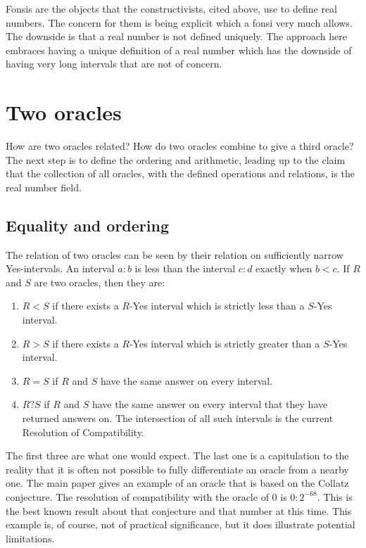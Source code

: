 \documentclass[12pt]{article}
\theoremstyle{remark}
\begin{document}
Fonsis are the objects that the constructivists, cited above, use to define real numbers. The concern for them is being explicit which a fonsi very much allows. The downside is that a real number is not defined uniquely. The approach here embraces having a unique definition of a real number which has the downside of having very long intervals that are not of concern. 

\section{Two oracles}

How are two oracles related? How do two oracles combine to give a third oracle?  The next step is to define the ordering and arithmetic, leading up to the claim that the collection of all oracles, with the defined operations and relations, is the real number field. 

\subsection{Equality and ordering}

The relation of two oracles can be seen by their relation on sufficiently narrow Yes-intervals. An interval $a:b$ is less than the interval $c:d$ exactly when $b < c$. If $R$ and $S$ are two oracles, then they are:
\begin{enumerate}
\item $R<S$ if there exists a $R$-Yes interval which is strictly less than a $S$-Yes interval.
\item $R>S$ if there exists a $R$-Yes interval which is strictly greater than a $S$-Yes interval.
\item $R=S$ if $R$ and $S$ have the same answer on every interval.
\item $R?S$ if $R$ and $S$ have the same answer on every interval that they have returned answers on. The intersection of all such intervals is the current Resolution of Compatibility. 
\end{enumerate}

The first three are what one would expect. The last one is a capitulation to the reality that it is often not possible to fully differentiate an oracle from a nearby one. The main paper gives an example of an oracle that is based on the Collatz conjecture. The resolution of compatibility with the oracle of 0 
 is $0:2^{-68}$. This is the best known result about that conjecture and that number at this time. This example is, of course, not of practical significance, but it does illustrate potential limitations. 
\end{document}

